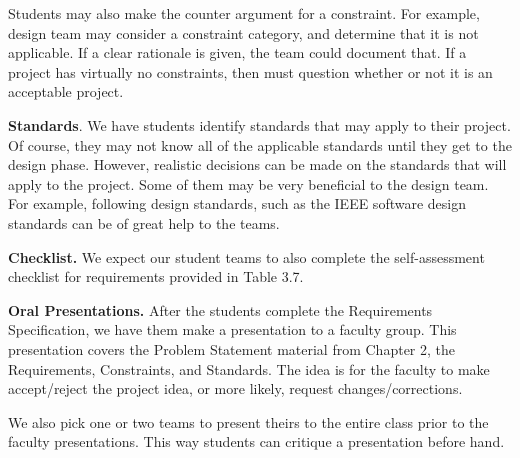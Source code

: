 \begin{enumerate}
\begin{onlysolution}
Students may also make the counter argument for a constraint. For
example, design team may consider a constraint category, and determine
that it is not applicable. If a clear rationale is given, the team could
document that. If a project has virtually no constraints, then must
question whether or not it is an acceptable project.

\textbf{Standards}. We have students identify standards that
may apply to their project. Of course, they may not know all of
the applicable standards until they get to the design phase.
However, realistic decisions can be made on the standards that will
apply to the project. Some of them may be very beneficial to the design
team. For example, following design standards, such as the IEEE software
design standards can be of great help to the teams.

\textbf{Checklist.} We expect our student teams to also complete
the self-assessment checklist for requirements provided in Table 3.7.

\textbf{Oral Presentations.} After the students complete the
Requirements Specification, we have them make a presentation to a
faculty group. This presentation covers the Problem Statement material
from Chapter 2, the Requirements, Constraints, and Standards. The idea
is for the faculty to make accept/reject the project idea, or more
likely, request changes/corrections.

We also pick one or two teams to present theirs to the entire class
prior to the faculty presentations. This way students can
critique a presentation before hand.

\end{onlysolution}

\end{enumerate}